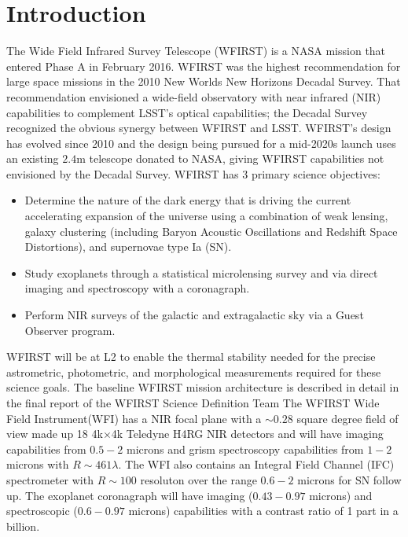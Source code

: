 
\section{Introduction}
\label{sec:wfirst:intro}


The Wide Field Infrared Survey Telescope (WFIRST) is a NASA mission that
entered Phase A in February 2016.  WFIRST was the highest recommendation
for large space missions in the 2010 New Worlds New Horizons Decadal
Survey.  That recommendation envisioned a wide-field observatory with
near infrared (NIR) capabilities to complement LSST's optical
capabilities; the Decadal Survey recognized the obvious synergy between
WFIRST and LSST.  WFIRST's design has evolved since 2010 and the design
being pursued for a mid-2020s launch uses an existing $2.4$m telescope
donated to NASA, giving WFIRST capabilities not envisioned by the
Decadal Survey.  WFIRST has 3 primary science objectives:

\begin{itemize}
\item Determine the nature of the dark energy that is driving the
current accelerating expansion of the universe using a combination of
weak lensing, galaxy clustering (including Baryon Acoustic Oscillations
and Redshift Space Distortions), and supernovae type Ia (SN).
\item Study exoplanets through a statistical microlensing survey and via
direct imaging and spectroscopy with a coronagraph.
\item Perform NIR surveys of the galactic and extragalactic sky via a
Guest Observer program.
\end{itemize}

WFIRST will be at L2 to enable the thermal stability needed for the
precise astrometric, photometric, and morphological measurements
required for these science goals. The baseline WFIRST mission
architecture is described in detail in the final report of the WFIRST
Science Definition Team \citep{2015arXiv150303757S}
The WFIRST Wide Field
Instrument(WFI) has a NIR focal plane with a $\sim0.28$ square degree
field of view made up 18 4k$\times$4k Teledyne H4RG NIR detectors and will
have imaging capabilities from $0.5-2$ microns and grism spectroscopy
capabilities from $1-2$ microns with $R\sim461\lambda$.  The WFI
also contains an Integral Field Channel (IFC) spectrometer with $R\sim100$
resoluton over the range $0.6-2$ microns for SN follow up. The exoplanet
coronagraph will have imaging ($0.43-0.97$ microns) and spectroscopic
($0.6-0.97 $ microns) capabilities with a contrast ratio of 1 part in a
billion.


